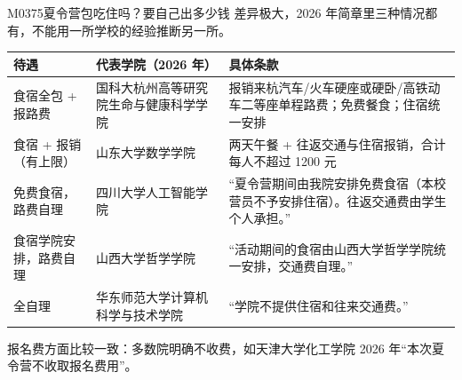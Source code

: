 \begin{qa}{M0375}{夏令营包吃住吗？要自己出多少钱}
差异极大，2026 年简章里三种情况都有，不能用一所学校的经验推断另一所。

\par\vspace{2pt}\nobreak\begin{center}\footnotesize
\begin{tabularx}{\textwidth}{>{\raggedright\arraybackslash}X>{\raggedright\arraybackslash}X>{\raggedright\arraybackslash}X}
\toprule
\textbf{待遇} & \textbf{代表学院（2026 年）} & \textbf{具体条款} \\ \midrule
食宿全包 + 报路费 & 国科大杭州高等研究院生命与健康科学学院 & 报销来杭汽车/火车硬座或硬卧/高铁动车二等座单程路费；免费餐食；住宿统一安排 \\
食宿 + 报销（有上限） & 山东大学数学学院 & 两天午餐 + 往返交通与住宿报销，合计每人不超过 1200 元 \\
免费食宿，路费自理 & 四川大学人工智能学院 & “夏令营期间由我院安排免费食宿（本校营员不予安排住宿）。往返交通费由学生个人承担。” \\
食宿学院安排，路费自理 & 山西大学哲学学院 & “活动期间的食宿由山西大学哲学学院统一安排，交通费自理。” \\
全自理 & 华东师范大学计算机科学与技术学院 & “学院不提供住宿和往来交通费。” \\
\bottomrule
\end{tabularx}
\end{center}\vspace{2pt}\par

报名费方面比较一致：多数院明确不收费，如天津大学化工学院 2026 年“本次夏令营不收取报名费用”。
\end{qa}

